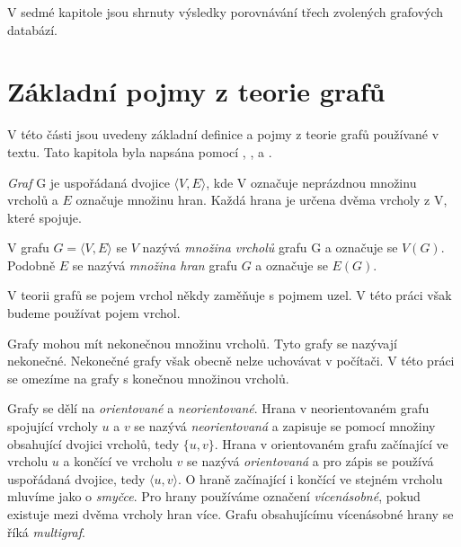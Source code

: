 \documentclass[
  program=infoi,
  biblatex=true,
  sourcecodes=true,
  figures=true,
  glossaries=false,
  index
]{kidiplom}
\begin{document}
V sedmé kapitole jsou shrnuty výsledky porovnávání třech zvolených grafových databází.

\newpage

\section{Základní pojmy z teorie grafů}

V této části jsou uvedeny základní definice a pojmy z teorie grafů používané v textu. Tato kapitola byla napsána pomocí \cite{graphIntroduction}, \cite{Ramba_2016}, \cite{disk} a \cite{directedGraph}.

\begin{definition}[Graf]
\textit{Graf} G je uspořádaná dvojice $\langle V,E\rangle$, kde V označuje neprázdnou množinu vrcholů a $E$ označuje množinu hran. Každá hrana je určena dvěma vrcholy z V, které spojuje.
\end{definition}

V grafu $G = \langle V,E\rangle$ se $V$ nazývá \textit{množina vrcholů} grafu G a označuje se $V(G)$. Podobně $E$ se nazývá \textit{množina hran} grafu $G$ a označuje se $E(G)$.

\begin{remark}[Vrchol]
V teorii grafů se pojem vrchol někdy zaměňuje s pojmem uzel. V této práci však budeme používat pojem vrchol.
\end{remark}

\begin{remark}
Grafy mohou mít nekonečnou množinu vrcholů. Tyto grafy se nazývají nekonečné. Nekonečné grafy však obecně nelze uchovávat v počítači. V této práci se omezíme na grafy s konečnou množinou vrcholů.
\end{remark}

Grafy se dělí na \textit{orientované} a \textit{neorientované}. Hrana v neorientovaném grafu spojující vrcholy $u$ a $v$ se nazývá \textit{neorientovaná} a zapisuje se pomocí množiny obsahující dvojici vrcholů, tedy $ \{ u, v \} $. Hrana v orientovaném grafu začínající ve vrcholu $u$ a končící ve vrcholu $v$ se nazývá \textit{orientovaná} a pro zápis se používá uspořádaná dvojice, tedy $\langle u, v \rangle$. O hraně začínající i končící ve stejném vrcholu mluvíme jako o \textit{smyčce}. Pro hrany používáme označení \textit{vícenásobné}, pokud existuje mezi dvěma vrcholy hran více. Grafu obsahujícímu vícenásobné hrany se říká \textit{multigraf}.
\end{document}
